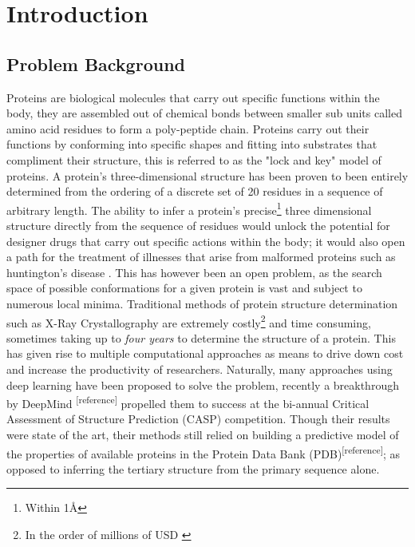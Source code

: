
\chapter{Introduction}

\section{Problem Background}
   Proteins are biological molecules that carry out specific functions within the body,
   they are assembled out of chemical bonds between smaller sub units called amino acid residues
   to form a poly-peptide chain. Proteins carry out their functions 
   by conforming into specific shapes and fitting into substrates that compliment their structure,
   this is referred to as the "lock and key" model of proteins. A
   protein's three-dimensional structure has been proven \cite{Anfinsen} to been
   entirely determined from the ordering of a discrete set of 20 residues
   in a sequence of arbitrary length. The ability to infer a protein's precise\footnote{Within 1\AA}
   three dimensional structure directly from the sequence of residues would
   unlock the potential for designer drugs that carry out specific actions within the body;
   it would also open a path for the treatment of illnesses that arise from malformed
   proteins such as huntington's disease \cite{lesk}.
   This has however been an open problem, as the search space of possible conformations
   for a given protein is vast and subject to numerous local minima. Traditional
   methods of protein structure determination such as X-Ray Crystallography \cite{lesk}
   are extremely costly\footnote{In the order of millions of USD \cite{alberts}} and time
   consuming, sometimes taking up to \emph{four years} to determine the structure of a protein.
   This has given rise to multiple computational approaches \cite{Cymerman2008} as means
   to drive down cost and increase the productivity of researchers. 
   \linebreak
   Naturally, many approaches using deep learning have been proposed to solve the problem,
   recently a breakthrough by DeepMind \textsuperscript{[reference]} propelled them to success
   at the bi-annual Critical Assessment of Structure Prediction (CASP) competition. Though their
   results were state of the art, their methods still relied on building a predictive model of the
   properties of available proteins in the Protein Data Bank (PDB)\textsuperscript{[reference]}; as 
   opposed to inferring the tertiary structure from the primary sequence alone.

